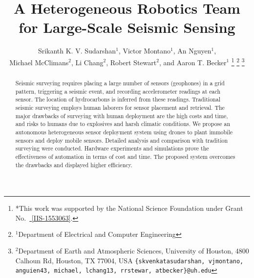 \documentclass[letterpaper, 10 pt, conference]{ieeeconf}
\begin{document}
%
\title{\LARGE \bf A Heterogeneous Robotics Team for Large-Scale Seismic Sensing} 

\author{Srikanth K. V. Sudarshan$^{1}$,
Victor Montano$^{1}$,
An Nguyen$^{1}$,\\ 
Michael McClimans$^{2}$,
Li Chang$^{2}$,
Robert Stewart$^{2}$, and
 Aaron T. Becker$^{1}$%
\thanks{*This work was supported by the National Science Foundation under Grant No.\ \href{http://nsf.gov/awardsearch/showAward?AWD_ID=1553063}{ [IIS-1553063]}.}%
\thanks{$^{1}$Department of Electrical and Computer Engineering}
\thanks{$^{2}$Department of Earth and Atmospheric Sciences, University of Houston, 4800 Calhoun Rd, Houston, TX 77004, USA
        {\tt\small \{skvenkatasudarshan, vjmontano, anguien43, michael, lchang13, rrstewar, atbecker\}@uh.edu}}%
}



\maketitle
\thispagestyle{empty}
\pagestyle{empty}


\begin{abstract}
Seismic surveying requires placing a large number of sensors (geophones) in a grid pattern, triggering a seismic event, and recording accelerometer readings at each sensor. 
The location of hydrocarbons is inferred from these readings.
Traditional seismic surveying employs human laborers for sensor placement and retrieval. 
The major drawbacks of surveying with human deployment are the high costs and time, and risks to humans due to explosives and harsh climatic conditions.
We propose an autonomous heterogeneous sensor deployment system using drones to plant immobile sensors and deploy mobile sensors.
Detailed analysis and comparison with tradition surveying were conducted. 
Hardware experiments and simulations prove the effectiveness of automation in terms of cost and time. 
The proposed system overcomes the drawbacks and displayed higher efficiency.
\end{abstract}


%

%

%

%

%

%






\end{document}
